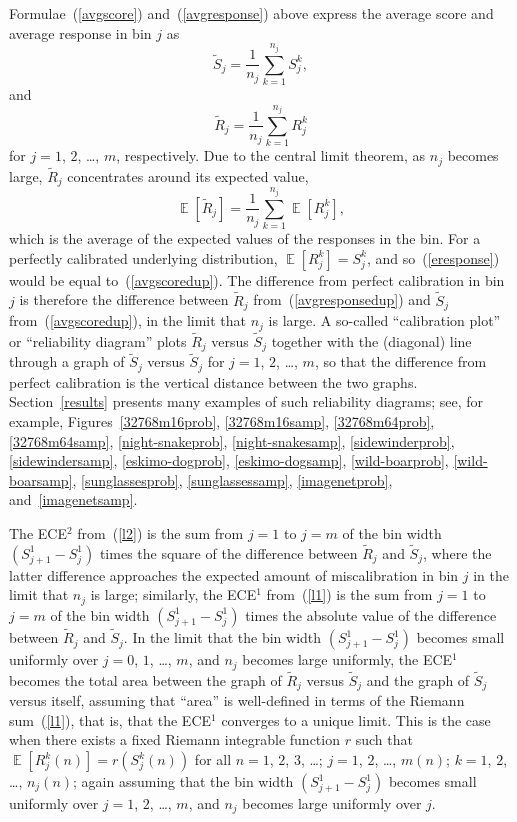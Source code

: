 \documentclass{article}
\DeclareMathOperator{\E}{\mathop{}\mathbb{E}}
\begin{document}
Formulae~(\ref{avgscore}) and~(\ref{avgresponse}) above
express the average score and average response in bin $j$ as
%
\begin{equation}
\label{avgscoredup}
\tilde{S}_j = \frac{1}{n_j} \sum_{k=1}^{n_j} S_j^k,
\end{equation}
%
and
%
\begin{equation}
\label{avgresponsedup}
\tilde{R}_j = \frac{1}{n_j} \sum_{k=1}^{n_j} R_j^k
\end{equation}
%
for $j = 1$, $2$, \dots, $m$, respectively.
Due to the central limit theorem, as $n_j$ becomes large,
$\tilde{R}_j$ concentrates around its expected value,
%
\begin{equation}
\label{eresponse}
\E[\tilde{R}_j] = \frac{1}{n_j} \sum_{k=1}^{n_j} \E[R_j^k],
\end{equation}
%
which is the average of the expected values of the responses in the bin.
For a perfectly calibrated underlying distribution, $\E[R_j^k] = S_j^k$,
and so~(\ref{eresponse}) would be equal to~(\ref{avgscoredup}).
The difference from perfect calibration in bin $j$ is therefore
the difference between $\tilde{R}_j$ from~(\ref{avgresponsedup})
and $\tilde{S}_j$ from~(\ref{avgscoredup}), in the limit that $n_j$ is large.
A so-called ``calibration plot'' or ``reliability diagram''
plots $\tilde{R}_j$ versus $\tilde{S}_j$ together
with the (diagonal) line through a graph of $\tilde{S}_j$ versus $\tilde{S}_j$
for $j = 1$, $2$, \dots, $m$, so that the difference from perfect calibration
is the vertical distance between the two graphs.
Section~\ref{results} presents many examples of such reliability diagrams;
see, for example, Figures~\ref{32768m16prob}, \ref{32768m16samp},
\ref{32768m64prob}, \ref{32768m64samp},
\ref{night-snakeprob}, \ref{night-snakesamp},
\ref{sidewinderprob}, \ref{sidewindersamp},
\ref{eskimo-dogprob}, \ref{eskimo-dogsamp},
\ref{wild-boarprob}, \ref{wild-boarsamp},
\ref{sunglassesprob}, \ref{sunglassessamp},
\ref{imagenetprob}, and~\ref{imagenetsamp}.

The ECE$^2$ from~(\ref{l2}) is the sum from $j = 1$ to $j = m$
of the bin width $(S_{j+1}^1 - S_j^1)$ times the square
of the difference between $\tilde{R}_j$ and $\tilde{S}_j$,
where the latter difference approaches the expected amount of miscalibration
in bin $j$ in the limit that $n_j$ is large; similarly,
the ECE$^1$ from~(\ref{l1}) is the sum from $j = 1$ to $j = m$
of the bin width $(S_{j+1}^1 - S_j^1)$ times the absolute value
of the difference between $\tilde{R}_j$ and $\tilde{S}_j$.
In the limit that the bin width $(S_{j+1}^1 - S_j^1)$ becomes small uniformly
over $j = 0$, $1$, \dots, $m$, and $n_j$ becomes large uniformly,
the ECE$^1$ becomes the total area between the graph
of $\tilde{R}_j$ versus $\tilde{S}_j$ and the graph
of $\tilde{S}_j$ versus itself, assuming that ``area'' is well-defined
in terms of the Riemann sum~(\ref{l1}), that is, that the ECE$^1$ converges
to a unique limit. This is the case when there exists
a fixed Riemann integrable function $r$ such that $\E[R_j^k(n)] = r(S_j^k(n))$
for all $n = 1$, $2$, $3$, \dots; $j = 1$, $2$, \dots, $m(n)$;
$k = 1$, $2$, \dots, $n_j(n)$;
again assuming that the bin width $(S_{j+1}^1 - S_j^1)$ becomes small uniformly
over $j = 1$, $2$, \dots, $m$, and $n_j$ becomes large uniformly over $j$.
\end{document}
